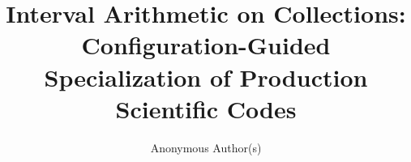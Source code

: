 \documentclass[sigconf,review,anonymous]{acmart}
\begin{document}
\title{Interval Arithmetic on Collections: Configuration-Guided
Specialization of Production Scientific Codes}

\author{Anonymous Author(s)}
\affiliation{\institution{}\country{}}

\begin{abstract}

\end{abstract}

\maketitle















\end{document}
